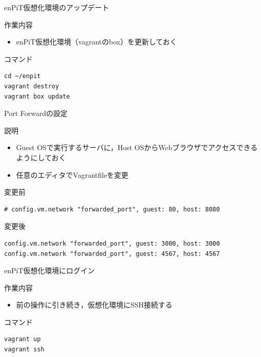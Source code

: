 \documentclass[t, aspectratio=169]{beamer}
\begin{document}
\begin{frame}[fragile,label=sec-1-5-2]{enPiT仮想化環境のアップデート}
 \begin{block}{作業内容}
\begin{itemize}
\item enPiT仮想化環境（vagrantのbox）を更新しておく
\end{itemize}
\end{block}

\begin{block}{コマンド}
\begin{verbatim}
cd ~/enpit
vagrant destroy
vagrant box update
\end{verbatim}
\end{block}
\end{frame}

\begin{frame}[fragile,label=sec-1-5-3]{Port Forwardの設定}
 \begin{block}{説明}
\begin{itemize}
\item Guest OSで実行するサーバに，Host OSからWebブラウザでアクセスできるようにしておく
\item 任意のエディタでVagrantfileを変更
\end{itemize}
\end{block}

\begin{block}{変更前}
\begin{verbatim}
# config.vm.network "forwarded_port", guest: 80, host: 8080
\end{verbatim}
\end{block}
\begin{block}{変更後}
\begin{verbatim}
config.vm.network "forwarded_port", guest: 3000, host: 3000
config.vm.network "forwarded_port", guest: 4567, host: 4567
\end{verbatim}
\end{block}
\end{frame}
\begin{frame}[fragile,label=sec-1-5-4]{enPiT仮想化環境にログイン}
 \begin{block}{作業内容}
\begin{itemize}
\item 前の操作に引き続き，仮想化環境にSSH接続する
\end{itemize}
\end{block}

\begin{block}{コマンド}
\begin{verbatim}
vagrant up
vagrant ssh
\end{verbatim}
\end{block}
\end{frame}
\end{document}
